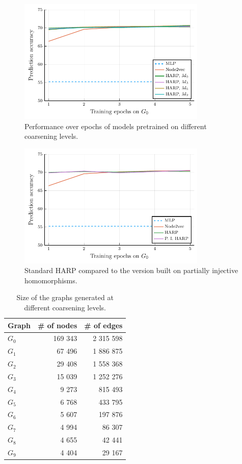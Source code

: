 \begin{figure}
  \centering
  \includegraphics[width=0.8\textwidth]{images/steps_accur/steps_accur.pdf}
  \caption{Performance over epochs of models pretrained on different coarsening levels.}\label{fig:steps-accuracy}
\end{figure}
\begin{figure}
  \centering
  \includegraphics[width=0.8\textwidth]{images/pihom_comparison/pihom_comparison.pdf}
  \caption{Standard HARP compared to the version built on partially injective homomorphisms.}\label{fig:HARP-vs-PIHom}
\end{figure}

\begin{table}
  \centering
  \begin{tabular}{lrr}
    \toprule
    Graph     & \# of nodes & \# of edges \\
    \midrule
    \( G_0 \) & 169 343     & 2 315 598   \\
    \( G_1 \) & 67 496      & 1 886 875   \\
    \( G_2 \) & 29 408      & 1 558 368   \\
    \( G_3 \) & 15 039      & 1 252 276   \\
    \( G_4 \) & 9 273       & 815 493     \\
    \( G_5 \) & 6 768       & 433 795     \\
    \( G_6 \) & 5 607       & 197 876     \\
    \( G_7 \) & 4 994       & 86 307      \\
    \( G_8 \) & 4 655       & 42 441      \\
    \( G_9 \) & 4 404       & 29 167      \\
  \end{tabular}
  \caption{Size of the graphs generated at different coarsening levels.}\label{tab:graph-sizes}
\end{table}

